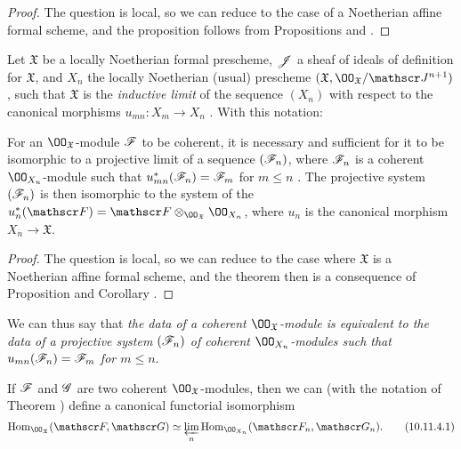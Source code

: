 \begin{proof}
\label{proof-1.10.11.1}
The question is local, so we can reduce to the case of a Noetherian affine formal scheme, and the proposition follows from Propositions  and .
\end{proof}

\begin{env}[10.11.2]
\label{1.10.11.2}
Let $\mathfrak{X}$ be a locally Noetherian formal prescheme, $\mathscr{J}$ a sheaf of ideals of definition for $\mathfrak{X}$, and $X_n$ the locally Noetherian (usual) prescheme $(\mathfrak{X},\OO_\mathfrak{X}/\sh{J}^{n+1})$, such that $\mathfrak{X}$ is the \emph{inductive limit} of the sequence $(X_n)$ with respect to the canonical morphisms $u_{mn}:X_m\to X_n$ .
With this notation:
\end{env}

\begin{thm}[10.11.3]
\label{1.10.11.3}
For an $\OO_\mathfrak{X}$-module $\mathscr{F}$ to be coherent, it is necessary and sufficient for it to be isomorphic to a projective limit of a sequence $(\mathscr{F}_n)$, where $\mathscr{F}_n$ is a coherent $\OO_{X_n}$-module such that $u_{mn}^*(\mathscr{F}_n)=\mathscr{F}_m$ for $m\leq n$ .
The projective system $(\mathscr{F}_n)$ is then isomorphic to the system of the $u_n^*(\sh{F})=\sh{F}\otimes_{\OO_\mathfrak{X}}\OO_{X_n}$, where $u_n$ is the canonical morphism $X_n\to\mathfrak{X}$.
\end{thm}

\begin{proof}
\label{proof-1.10.11.3}
The question is local, so we can reduce to the case where $\mathfrak{X}$ is a Noetherian affine formal scheme, and the theorem then is a consequence of Proposition  and Corollary .
\end{proof}

We can thus say that \emph{the data of a coherent $\OO_\mathfrak{X}$-module is equivalent to the data of a projective system $(\mathscr{F}_n)$ of coherent $\OO_{X_n}$-modules such that $u_{mn}(\mathscr{F}_n)=\mathscr{F}_m$ for $m\leq n$}.

\begin{cor}[10.11.4]
\label{1.10.11.4}
If $\mathscr{F}$ and $\mathscr{G}$ are two coherent $\OO_\mathfrak{X}$-modules, then we can (with the notation of Theorem ) define a canonical functorial isomorphism
\begin{equation*}
\label{1.10.11.4.1}
  \Hom_{\OO_\mathfrak{X}}(\sh{F},\sh{G})\isoto\varprojlim_n\Hom_{\OO_{X_n}}(\sh{F}_n,\sh{G}_n).
  \tag{10.11.4.1}
\end{equation*}
\end{cor}

